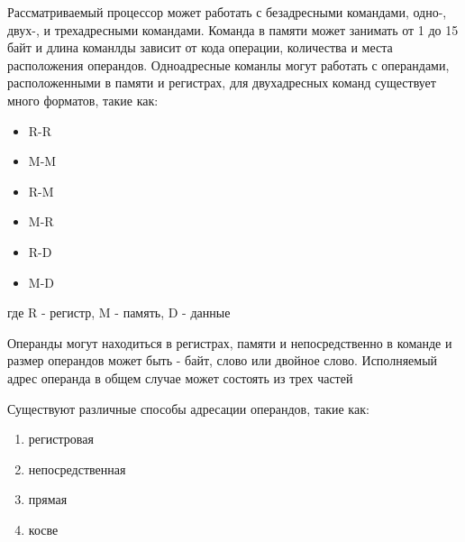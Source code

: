 Рассматриваемый процессор может работать с безадресными командами, одно-, двух-, и трехадресными командами. Команда в памяти может занимать от 1 до 15 байт и длина команлды зависит от кода операции, количества и места расположения операндов. Одноадресные команлы могут работать с операндами, расположенными в памяти и регистрах, для двухадресных команд существует много форматов, такие как:
\begin{itemize}
    \item R-R 
    \item M-M 
    \item R-M 
    \item M-R 
    \item R-D 
    \item M-D
\end{itemize}
где R - регистр, M - память, D - данные

Операнды могут находиться в регистрах, памяти и непосредственно в команде и размер операндов может быть - байт, слово или двойное слово. 
Исполняемый адрес операнда в общем случае может состоять из трех частей

Существуют различные способы адресации операндов, такие как:
\begin{enumerate}
    \item регистровая
    \item непосредственная
    \item прямая
    \item косве
\end{enumerate}